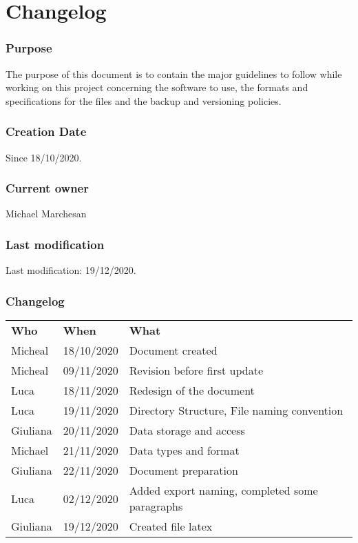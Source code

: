 \section{Changelog}

\subsubsection{Purpose}
The purpose of this document is to contain the major guidelines to follow while working on this project concerning the software to use, the formats and specifications for the files and the backup and versioning policies.

\subsubsection{Creation Date}
Since 18/10/2020.\\

\subsubsection{Current owner}
Michael Marchesan

\subsubsection{Last modification}
Last modification: 19/12/2020.

\subsubsection{Changelog}
\begin{longtable}{ m{2cm}m{3cm}m{8cm}} 
\centering 
 \textbf{Who}& \textbf{When} & \textbf{What}\\
Micheal & 18/10/2020 & Document created \\
Micheal & 09/11/2020 & Revision before first update \\
Luca & 18/11/2020 & Redesign of the document \\
Luca & 19/11/2020 & Directory Structure, File naming convention \\
Giuliana & 20/11/2020 & Data storage and access \\
Michael & 21/11/2020 & Data types and format  \\
Giuliana & 22/11/2020 & Document preparation \\
Luca & 02/12/2020 & Added export naming, completed some paragraphs \\
Giuliana & 19/12/2020 & Created file latex \\

\end{longtable}

\pagebreak
